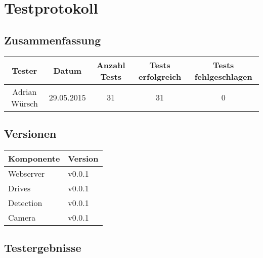 \section{Testprotokoll}
\label{sec:testprotokoll}

\subsection{Zusammenfassung}

\begin{table}[h!]
	\centering
	\renewcommand{\arraystretch}{1.5}
	\begin{tabular}{|c|c|c|c|c|}
		\hline \textbf{Tester} & \textbf{Datum} & \textbf{Anzahl Tests} & \textbf{Tests erfolgreich} & \textbf{Tests fehlgeschlagen} \\
		\hline Adrian Würsch & 29.05.2015 & 31 & 31 & 0 \\ 
		\hline 
	\end{tabular}
\end{table}

\subsection{Versionen}

\begin{table}[h!]
	\centering
	\renewcommand{\arraystretch}{1.5}
	\begin{tabular}{|l|l|}
		\hline \textbf{Komponente} & \textbf{Version} \\
		\hline Webserver & v0.0.1 \\
		\hline Drives & v0.0.1 \\
		\hline Detection & v0.0.1 \\
		\hline Camera & v0.0.1 \\
		\hline 
	\end{tabular}
\end{table}

\newpage
\subsection{Testergebnisse}

